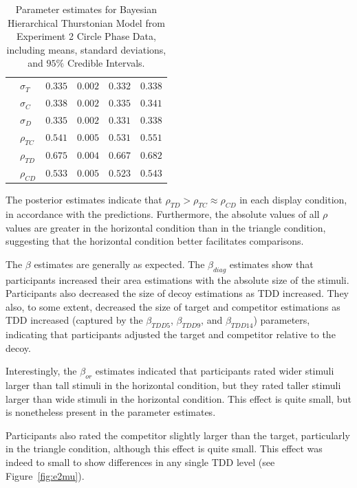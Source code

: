 \begin{table}[ht]
\begin{tabular}{llrrrr}
                    &  $\sigma_{T}$    &    $0.335$   &   $0.002$   &  $0.332$     & $0.338$     \\
                    &  $\sigma_{C}$    &    $0.338$   &   $0.002$   &  $0.335$     & $0.341$     \\
                    &  $\sigma_{D}$    &    $0.335$   &   $0.002$   &  $0.331$     & $0.338$     \\
                    &  $\rho_{TC}$     &    $0.541$   &   $0.005$   &  $0.531$     & $0.551$     \\
                    &  $\rho_{TD}$     &    $0.675$   &   $0.004$   &  $0.667$     & $0.682$     \\
                    &  $\rho_{CD}$     &    $0.533$   &   $0.005$   &  $0.523$     & $0.543$     \\
        \bottomrule
    \end{tabular}
    \caption{Parameter estimates for Bayesian Hierarchical Thurstonian Model from Experiment 2 Circle Phase Data, including means, standard deviations, and $95\%$ Credible Intervals.}
    \label{tab:e2_params}
\end{table}

The posterior estimates indicate that $\rho_{TD}>\rho_{TC}\approx\rho_{CD}$ in each display condition, in accordance with the predictions. Furthermore, the absolute values of all $\rho$ values are greater in the horizontal condition than in the triangle condition, suggesting that the horizontal condition better facilitates comparisons. 

The $\beta$ estimates are generally as expected. The $\beta_{diag}$ estimates show that participants increased their area estimations with the absolute size of the stimuli. Participants also decreased the size of decoy estimations as TDD increased. They also, to some extent, decreased the size of target and competitor estimations as TDD increased (captured by the $\beta_{TDD5}$, $\beta_{TDD9}$, and $\beta_{TDD14}$) parameters, indicating that participants adjusted the target and competitor relative to the decoy.

Interestingly, the $\beta_{or}$ estimates indicated that participants rated wider stimuli larger than tall stimuli in the horizontal condition, but they rated taller stimuli larger than wide stimuli in the horizontal condition. This effect is quite small, but is nonetheless present in the parameter estimates.

Participants also rated the competitor slightly larger than the target, particularly in the triangle condition, although this effect is quite small. This effect was indeed to small to show differences in any single TDD level (see Figure~\ref{fig:e2mu}). 

